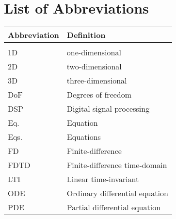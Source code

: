 \chapter{List of Abbreviations}
{\centering\renewcommand{\arraystretch}{1.1}
\begin{longtable}{ p{3cm} p{8cm}}
 Abbreviation & Definition\\
 \hline\\
 \endhead
 1D & one-dimensional\\
 2D & two-dimensional \\
 3D & three-dimensional \\
 DoF & Degrees of freedom \\
 DSP & Digital signal processing \\
 Eq. & Equation \\
 Eqs. & Equations\\
 FD & Finite-difference\\
 FDTD & Finite-difference time-domain\\
 LTI & Linear time-invariant\\
 ODE & Ordinary differential equation\\
 PDE & Partial differential equation
\end{longtable}}